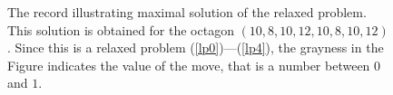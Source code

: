 \begin{figure}[H]
\centering
{}
  \caption{The record illustrating maximal solution of the relaxed problem. This solution is obtained for the octagon $(10, 8, 10, 12, 10, 8, 10, 12)$. Since this is a relaxed problem (\ref{lp0})---(\ref{lp4}), the grayness in the Figure indicates the value of the move, that is a number between $0$ and $1$.  }
  \label{therecord}
  \end{figure}